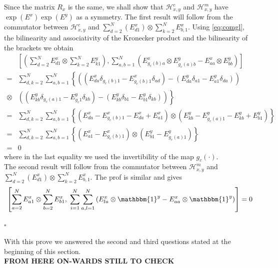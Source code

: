 \documentclass[11pt]{article}
\numberwithin{equation}{section}
\numberwithin{equation}{subsection}
\begin{document}
Since the matrix $R_{x}$ is the same, we shall show that $\mathcal{H}_{x,y}^{c}$ and $\mathcal{H}_{x,y}^{m}$ have $\exp{(E^{x})}\exp{(E^{y})}$ as a symmetry. The first result will follow from the commutator between $\mathcal{H}_{x,y}^{c}$ and $\sum_{d=2}^{N}(E_{d1}^{x})\otimes \sum_{k=2}^{N}E_{b,1}^{x}$. Using \eqref{eq:comgl}, the bilinearity and associativity of the Kronecker product and the bilinearity of the brackets we obtain 
\begin{align*}
	&\left[\left(\sum_{d=2}^{N}E_{d1}^{x}\otimes\sum_{k=2}^{N}E_{k1}^{y}\right), \sum_{a,b=1}^{N}\left(E_{g_{c}(b)a}^{x}\otimes E_{g_{c}(a)b}^{y} -E_{aa}^{x}\otimes E_{bb}^{y}\right)\right]
	\\=&
	\sum_{d,k=2}^{N}\sum_{a,b=1}^{N}\left\{\left((E_{da}^{x}\delta_{g_{c}(b)1}-E_{g_{c}(b)1}^{x}\delta_{ad})-(E_{da}^{y}\delta_{a1}-E_{a1}^{y}\delta_{da})\right)\right. \\ \otimes&\left. \left((E_{kb}^{y}\delta_{g_{c}(a)1}-E_{g_{c}1}^{y}\delta_{kb})-(E_{kb}^{y}\delta_{b1}-E_{b1}^{y}\delta_{kb})\right)\right\}
	\\=&
	\sum_{d,k=2}^{N}\sum_{a,b=1}^{N}\left\{\left(E_{da}^{x}-E_{g_{c}(b)1}^{x}-E_{da}^{x}+E_{a1}^{x}\right)\otimes\left(E_{kb}^{y}-E_{g_{c}(a)1}^{y}-E_{kb}^{y}+E_{b1}^{y}\right)\right\}
	\\=&
	\sum_{d,k=2}^{N}\sum_{a,b=1}^{N}\left\{\left(E_{a1}^{x}-E_{g_{c}(b)1}^{x}\right)\otimes \left(E_{b1}^{y}-E_{g_{c}(a)1}^{y}\right)\right\}
	\\=&0
\end{align*}
where in the last equality we used the invertibility of the map $g_{c}(\cdot)$. \\
The second result will follow from the commutator between $\mathcal{H}_{x,y}^{m}$ and $\sum_{d=2}^{N}(E_{d1}^{x})\otimes \sum_{k=2}^{N}E_{b,1}^{x}$. The prof is similar and gives
\begin{equation}
	\left[\sum_{a=2}^{N}E_{a1}^{x}\otimes \sum_{b=2}^{N}E_{b1}^{x},\;\sum_{i=1}^{N}\sum_{a,l=1}^{N}\left(E_{la}^{x}\otimes \mathbbm{1}^{y}-E_{aa}^{x}\otimes \mathbbm{1}^{y}\right)\right]=0
\end{equation}
\begin{flushright}
	$\square$
\end{flushright}
With this prove we answered the second and third questions stated at the beginning of this section. \\
\textbf{FROM HERE ON-WARDS STILL TO CHECK}\\
\end{document}
